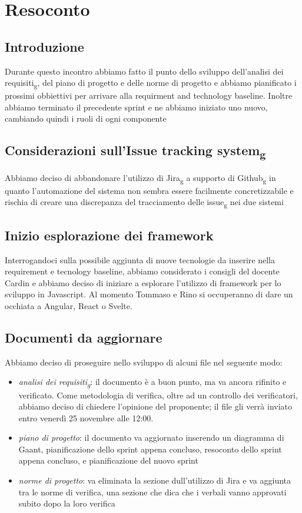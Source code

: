 \section{Resoconto}
\subsection{Introduzione}
Durante questo incontro abbiamo fatto il punto dello sviluppo dell'analisi dei requisiti\textsubscript{g}, del piano di progetto e delle norme di progetto e abbiamo pianificato i prossimi obbiettivi per arrivare alla requirment and technology baseline. Inoltre abbiamo terminato il precedente sprint e ne abbiamo iniziato uno nuovo, cambiando quindi i ruoli di ogni componente

\subsection{Considerazioni sull'Issue tracking system\textsubscript{g}}
Abbiamo deciso di abbandonare l'utilizzo di Jira\textsubscript{g} a supporto di Github\textsubscript{g} in quanto l'automazione del sistema non sembra essere facilmente concretizzabile e rischia di creare una discrepanza del tracciamento delle issue\textsubscript{g} nei due sistemi

\subsection{Inizio esplorazione dei framework}
Interrogandoci sulla possibile aggiunta di nuove tecnologie da inserire nella requirement e tecnology baseline, abbiamo considerato i consigli del docente Cardin e abbiamo deciso di iniziare a esplorare l'utilizzo di framework per lo sviluppo in Javascript. Al momento Tommaso e Rino si occuperanno di dare un occhiata a Angular, React o Svelte.


\subsection{Documenti da aggiornare}
Abbiamo deciso di proseguire nello sviluppo di alcuni file nel seguente modo:
\begin{itemize}
	\item \textit{analisi dei requisiti\textsubscript{g}}: il documento è a buon punto, ma va ancora rifinito e verificato. Come metodologia di verifica, oltre ad un controllo dei verificatori, abbiamo deciso di chiedere l'opinione del proponente; il file gli verrà inviato entro venerdì 25 novembre alle 12:00.
	\item \textit{piano di progetto}: il documento va aggiornato inserendo un diagramma di Gaant, pianificazione dello sprint appena concluso, resoconto dello sprint appena concluso, e pianificazione del nuovo sprint
	\item \textit{norme di progetto}: va eliminata la sezione dull'utilizzo di Jira e va aggiunta tra le norme di verifica, una sezione che dica che i verbali vanno approvati subito dopo la loro verifica
\end{itemize}

